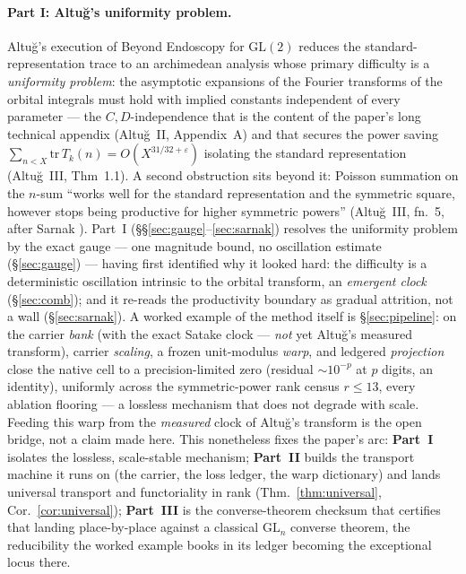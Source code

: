 \documentclass[11pt]{article}
\theoremstyle{definition}
\begin{document}
\paragraph{Part I: Altu\u{g}'s uniformity problem.} Altu\u{g}'s execution of Beyond Endoscopy for
$\mathrm{GL}(2)$ \cite{AltI,AltII,AltIII} reduces the standard-representation trace to an archimedean
analysis whose primary difficulty is a \emph{uniformity problem}: the asymptotic expansions of the
Fourier transforms of the orbital integrals must hold with implied constants independent of every
parameter --- the $C,D$-independence that is the content of the paper's long technical appendix
(Altu\u{g}~II, Appendix~A) and that secures the power saving
$\sum_{n<X}\mathrm{tr}\,T_k(n)=O(X^{31/32+\varepsilon})$ isolating the standard representation
(Altu\u{g}~III, Thm~1.1). A second obstruction sits beyond it: Poisson summation on the $n$-sum
``works well for the standard representation and the symmetric square, however stops being productive
for higher symmetric powers'' (Altu\u{g}~III, fn.~5, after Sarnak \cite{Sar}). Part~I
(\S\S\ref{sec:gauge}--\ref{sec:sarnak}) resolves the uniformity problem by the exact gauge --- one
magnitude bound, no oscillation estimate (\S\ref{sec:gauge}) --- having first identified why it looked
hard: the difficulty is a deterministic oscillation intrinsic to the orbital transform, an \emph{emergent clock}
(\S\ref{sec:comb}); and it re-reads the productivity boundary as gradual attrition, not a wall
(\S\ref{sec:sarnak}). A worked example of the method itself is \S\ref{sec:pipeline}: on the carrier
\emph{bank} (with the exact Satake clock --- \emph{not} yet Altu\u{g}'s measured transform), carrier
\emph{scaling}, a frozen unit-modulus \emph{warp}, and ledgered \emph{projection} close the native cell to a
precision-limited zero (residual $\sim10^{-p}$ at $p$ digits, an identity), uniformly across the
symmetric-power rank census $r\le13$, every ablation flooring --- a lossless mechanism that does not degrade
with scale. Feeding this warp from the \emph{measured} clock of Altu\u{g}'s transform is the open bridge, not a
claim made here. This nonetheless fixes the paper's arc: \textbf{Part~I} isolates the lossless, scale-stable
mechanism; \textbf{Part~II} builds the transport machine it runs on (the carrier, the loss ledger, the warp
dictionary) and lands universal transport and functoriality in rank (Thm.~\ref{thm:universal},
Cor.~\ref{cor:universal}); \textbf{Part~III} is the converse-theorem checksum that certifies that landing
place-by-place against a classical $\mathrm{GL}_n$ converse theorem, the reducibility the worked example books in
its ledger becoming the exceptional locus there.
\end{document}
